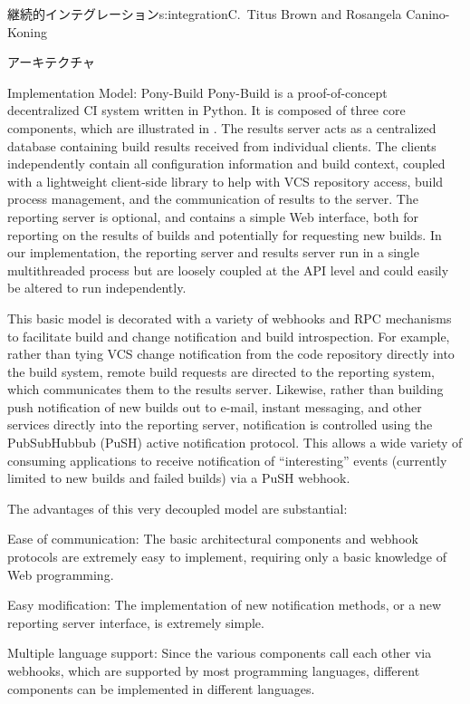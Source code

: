\begin{aosachapter}{継続的インテグレーション}{s:integration}{C.\ Titus Brown and Rosangela Canino-Koning}
\begin{aosasect1}{アーキテクチャ}
\begin{aosasect2}{Implementation Model: Pony-Build}
Pony-Build is a proof-of-concept decentralized CI system written in
Python. It is composed of three core components, which are illustrated
in . The results server acts as a
centralized database containing build results received from individual
clients. The clients independently contain all configuration
information and build context, coupled with a lightweight client-side
library to help with VCS repository access, build process management,
and the communication of results to the server. The reporting server
is optional, and contains a simple Web interface, both for reporting
on the results of builds and potentially for requesting new builds. In
our implementation, the reporting server and results server run in a
single multithreaded process but are loosely coupled at the API level
and could easily be altered to run independently.

This basic model is decorated with a variety of webhooks and RPC
mechanisms to facilitate build and change notification and build
introspection. For example, rather than tying VCS change notification
from the code repository directly into the build system, remote build
requests are directed to the reporting system, which communicates them
to the results server. Likewise, rather than building push
notification of new builds out to e-mail, instant messaging, and other
services directly into the reporting server, notification is
controlled using the PubSubHubbub (PuSH) active notification
protocol. This allows a wide variety of consuming applications to
receive notification of ``interesting'' events (currently limited to
new builds and failed builds) via a PuSH webhook.

The advantages of this very decoupled model are substantial:

\begin{aosadescription}

  \item{Ease of communication:} The basic architectural
  components and webhook protocols are extremely easy to implement,
  requiring only a basic knowledge of Web programming.

  \item{Easy modification:} The implementation of new
  notification methods, or a new reporting server interface, is
  extremely simple.

  \item{Multiple language support:} Since the various components
  call each other via webhooks, which are supported by most
  programming languages, different components can be implemented in
  different languages.


\end{aosadescription}
\end{aosasect2}
\end{aosasect1}
\end{aosachapter}
